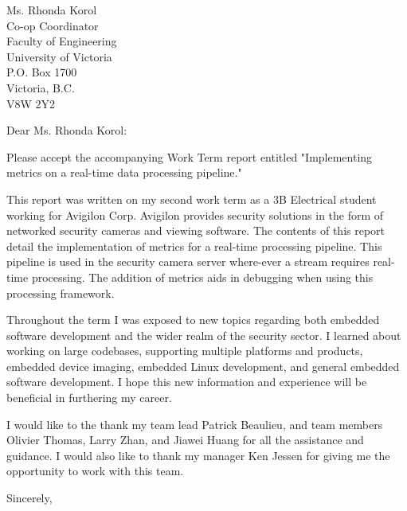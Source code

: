 \documentclass{letter}
\begin{document}
\begin{letter}{Ms. Rhonda Korol \\ Co-op Coordinator \\ Faculty of Engineering
\\ University of Victoria \\ P.O. Box 1700 \\ Victoria, B.C. \\ V8W 2Y2}
\opening{Dear Ms. Rhonda Korol:}

Please accept the accompanying Work Term report entitled "Implementing
metrics on a real-time data processing pipeline."

This report was written on my second work term as a 3B Electrical student
working for Avigilon Corp. Avigilon provides security solutions in the form of
networked security cameras and viewing software. The contents of this report
detail the implementation of metrics for a real-time processing pipeline. This
pipeline is used in the security camera server where-ever a stream requires
real-time processing. The addition of metrics aids in debugging when using this
processing framework.

Throughout the term I was exposed to new topics regarding both embedded software
development and the wider realm of the security sector. I learned about working
on large codebases, supporting multiple platforms and products, embedded device
imaging, embedded Linux development, and general embedded software development.
I hope this new information and experience will be beneficial in furthering my career.

I would like to the thank my team lead Patrick Beaulieu, and team members
Olivier Thomas, Larry Zhan, and Jiawei Huang for all the assistance and
guidance. I would also like to thank my manager Ken Jessen for giving me the
opportunity to work with this team.

\closing{Sincerely,}

\end{letter}
\end{document}
